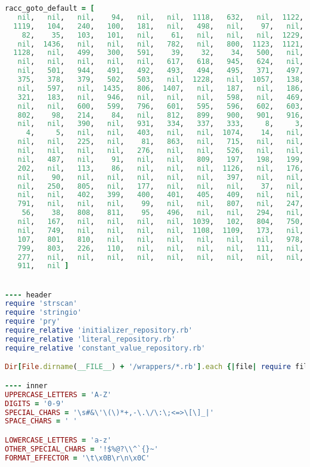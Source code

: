 \begin{lstlisting}[language=Ruby, style=rubystyle]
racc_goto_default = [
   nil,   nil,   nil,    94,   nil,   nil,  1118,   632,   nil,  1122,
  1119,   104,   240,   100,   181,   nil,   498,   nil,    97,   nil,
    82,    35,   103,   101,   nil,    61,   nil,   nil,   nil,  1229,
   nil,  1436,   nil,   nil,   nil,   782,   nil,   800,  1123,  1121,
  1128,   nil,   499,   300,   591,    39,    32,    34,   500,   nil,
   nil,   nil,   nil,   nil,   nil,   617,   618,   945,   624,   nil,
   nil,   501,   944,   491,   492,   493,   494,   495,   371,   497,
   375,   378,   379,   502,   503,   nil,  1228,   nil,  1057,   138,
   nil,   597,   nil,  1435,   806,  1407,   nil,   187,   nil,   186,
   321,   183,   nil,   946,   nil,   nil,   nil,   598,   nil,   469,
   nil,   nil,   600,   599,   796,   601,   595,   596,   602,   603,
   802,    98,   214,    84,   nil,   812,   899,   900,   901,   916,
   nil,   nil,   390,   nil,   931,   334,   337,   333,     8,     3,
     4,     5,   nil,   nil,   403,   nil,   nil,  1074,    14,   nil,
   nil,   nil,   225,   nil,    81,   863,   nil,   715,   nil,   nil,
   nil,   nil,   nil,   nil,   276,   nil,   nil,   526,   nil,   nil,
   nil,   487,   nil,    91,   nil,   nil,   809,   197,   198,   199,
   202,   nil,   113,    86,   nil,   nil,   nil,  1126,   nil,   176,
   nil,    90,   nil,   nil,   nil,   nil,   nil,   397,   nil,   nil,
   nil,   250,   805,   nil,   177,   nil,   nil,   nil,    37,   nil,
   nil,   nil,   402,   399,   400,   401,   405,   409,   nil,   nil,
   791,   nil,   nil,   nil,    99,   nil,   nil,   807,   nil,   247,
    56,    38,   808,   811,    95,   496,   nil,   nil,   294,   nil,
   nil,   167,   nil,   nil,   nil,   nil,  1039,   102,   804,   750,
   nil,   749,   nil,   nil,   nil,   nil,  1108,  1109,   173,   nil,
   107,   801,   810,   nil,   nil,   nil,   nil,   nil,   nil,   978,
   799,   803,   226,   110,   nil,   nil,   nil,   nil,   111,   nil,
   277,   nil,   nil,   nil,   nil,   nil,   nil,   nil,   nil,   nil,
   911,   nil ]


---- header
require 'strscan'
require 'stringio'
require 'pry'
require_relative 'initializer_repository.rb'
require_relative 'literal_repository.rb'
require_relative 'constant_value_repository.rb'

Dir[File.dirname(__FILE__) + '/wrappers/*.rb'].each {|file| require file}

---- inner
UPPERCASE_LETTERS = 'A-Z'
DIGITS = '0-9'
SPECIAL_CHARS = '\s#&\'\(\)*+,-\.\/\:\;<=>\[\]_|'
SPACE_CHARS = ' '

LOWERCASE_LETTERS = 'a-z'
OTHER_SPECIAL_CHARS = '!$%@?\\^`{}~'
FORMAT_EFFECTOR = '\t\x0B\r\n\x0C'


\end{lstlisting}
